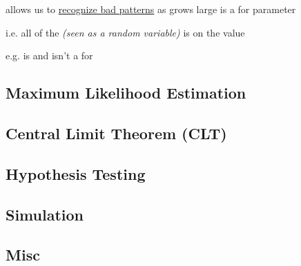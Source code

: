 \hSep

\begin{enumerate}
    \vItem {} allows us to \ul{recognize bad patterns} as  grows large
    \vItem {} is a  for parameter \iMbox{\theta} 
    \begin{enumerate}
        \vItem {}
        \vItem i.e. all  of the  \textit{(seen as a random variable)} 
               is  on the value \iMbox{\theta}
    \end{enumerate}
    \vItem e.g.  is and  isn't a  for \iMbox{\mu}
\end{enumerate}

\hSep

\subsection*{Maximum Likelihood Estimation}


\hSep

\subsection*{Central Limit Theorem (CLT)}


\hSep

\subsection*{Hypothesis Testing}


\hSep

\subsection*{Simulation}


\hSep

\subsection*{Misc}


\hSep